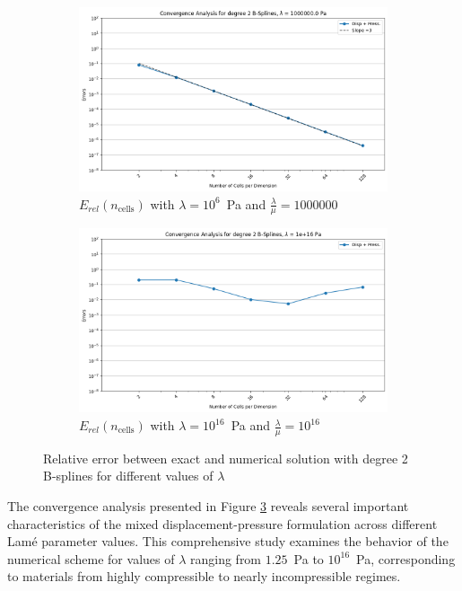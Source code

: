 \documentclass[a4paper,12pt,twoside]{report}
\begin{document}
\begin{figure}[!h]
\begin{subfigure}[b]{0.49\textwidth}
		\includegraphics[width=\textwidth]{figures/figures_mixed_DH/sum_convergence_plot_degree_2_lambda=1000000.0.png}
		\caption{$E_{rel}(n_{\text{cells}})$ with $\lambda = 10^6$~Pa and $\frac{\lambda}{\mu} = 1000000$}
		\label{fig:convergencedegree2mixeddirichlethomogeneouslambda1000000}
	\end{subfigure}
		\begin{subfigure}[b]{0.49\textwidth}
		\centering
		\includegraphics[width=\textwidth]{figures/figures_mixed_DH/sum_convergence_plot_degree_2_lambda=1e+16.png}
		\caption{$E_{rel}(n_{\text{cells}})$ with $\lambda = 10^{16}$~Pa and $\frac{\lambda}{\mu} = 10^{16}$}
		\label{fig:convergencedegree2mixeddirichlethomogeneouslambda1e16}
	\end{subfigure}
	\caption{Relative error between exact and numerical solution with degree 2 B-splines for different values of $\lambda$}
	\label{fig:convergencedegree2mixeddirichlethomogeneous}
\end{figure}


The convergence analysis presented in Figure \ref{fig:convergencedegree2mixeddirichlethomogeneous} reveals several important characteristics of the mixed displacement-pressure formulation across different Lamé parameter values. This comprehensive study examines the behavior of the numerical scheme for values of $\lambda$ ranging from $1.25$~Pa to $10^{16}$~Pa, corresponding to materials from highly compressible to nearly incompressible regimes.
\end{document}
